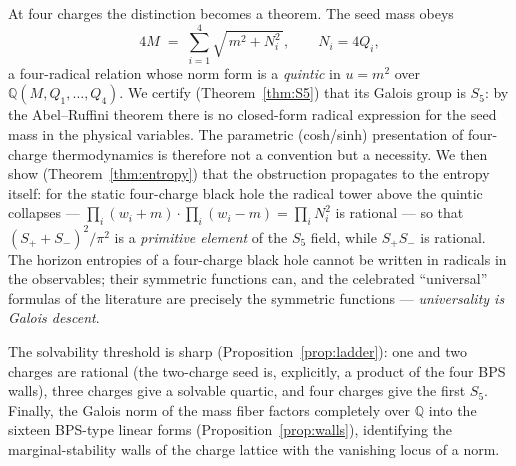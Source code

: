 \documentclass[11pt]{article}
\theoremstyle{definition}
\theoremstyle{remark}
\newcommand{\Q}{\mathbb{Q}}
\begin{document}
At four charges the distinction becomes a theorem. The seed mass obeys
\begin{equation}
4M \;=\; \sum_{i=1}^{4}\sqrt{\,m^2+N_i^2\,},\qquad N_i=4Q_i ,
\label{eq:massfiber}
\end{equation}
a four-radical relation whose norm form is a \emph{quintic} in $u=m^2$ over
$\Q(M,Q_1,\dots,Q_4)$. We certify (Theorem~\ref{thm:S5}) that its Galois group
is $S_5$: by the Abel--Ruffini theorem there is no closed-form radical
expression for the seed mass in the physical variables. The parametric
(cosh/sinh) presentation of four-charge thermodynamics is therefore not a
convention but a necessity. We then show (Theorem~\ref{thm:entropy}) that the
obstruction propagates to the entropy itself: for the static four-charge black
hole the radical tower above the quintic collapses --- $\prod_i(w_i+m)\cdot
\prod_i(w_i-m)=\prod_i N_i^2$ is rational --- so that
$(S_++S_-)^2/\pi^2$ is a \emph{primitive element} of the $S_5$ field, while
$S_+S_-$ is rational. The horizon entropies of a four-charge black hole cannot
be written in radicals in the observables; their symmetric functions can, and
the celebrated ``universal'' formulas of the literature are precisely the
symmetric functions --- \emph{universality is Galois descent}.

The solvability threshold is sharp (Proposition~\ref{prop:ladder}): one and
two charges are rational (the two-charge seed is, explicitly, a product of the
four BPS walls), three charges give a solvable quartic, and four charges give
the first $S_5$. Finally, the Galois norm of the mass fiber factors completely
over $\Q$ into the sixteen BPS-type linear forms (Proposition~\ref{prop:walls}),
identifying the marginal-stability walls of the charge lattice with the
vanishing locus of a norm.
\end{document}
